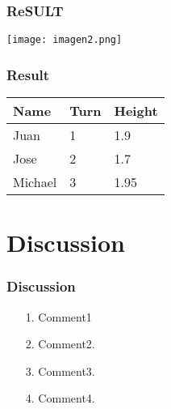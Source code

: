 \documentclass{beamer}
\begin{document}
\begin{frame}
\frametitle{ReSULT}


\begin{center}
\texttt{[image: imagen2.png]}%
\end{center}
\end{frame}

\begin{frame}
\frametitle{Result}


\begin{table}[!ht]
    \centering
    \begin{tabular}{|l|l|l|}
    \hline
        Name & Turn & Height \\ \hline
        Juan & 1 & 1.9 \\ \hline
        Jose & 2 & 1.7 \\ \hline
        Michael  & 3 & 1.95 \\ \hline
    \end{tabular}
\end{table}
\end{frame}


\section{Discussion}



\begin{frame}
\frametitle{ Discussion}

\begin{itemize}
\item[1.] Comment1
\item[2.] Comment2.
\item[3.] Comment3.
\item[4.] Comment4.
 \end{itemize}

\end{frame}
\end{document}
